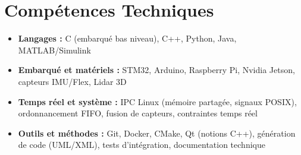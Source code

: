 \documentclass[a4paper,11pt]{article}
\begin{document}
\section{Compétences Techniques}
\begin{itemize}[leftmargin=*, nosep]
    \item \small{\textbf{Langages :} C (embarqué bas niveau), C++, Python, Java, MATLAB/Simulink}
    \item \small{\textbf{Embarqué et matériels :} STM32, Arduino, Raspberry Pi, Nvidia Jetson, capteurs IMU/Flex, Lidar 3D}
    \item \small{\textbf{Temps réel et système :} IPC Linux (mémoire partagée, signaux POSIX), ordonnancement FIFO, fusion de capteurs, contraintes temps réel}
    \item \small{\textbf{Outils et méthodes :} Git, Docker, CMake, Qt (notions C++), génération de code (UML/XML), tests d'intégration, documentation technique}
\end{itemize}

\end{document}
